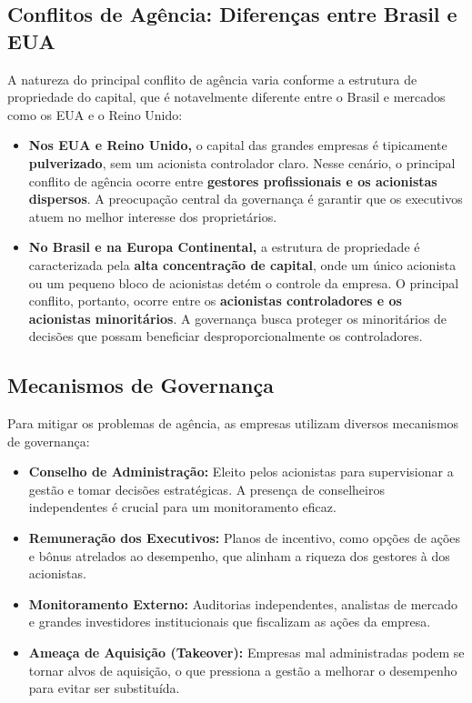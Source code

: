\documentclass[
  a4paper,
]{book}
\providecommand{\tightlist}{%
  \setlength{\itemsep}{0pt}\setlength{\parskip}{0pt}}\usepackage{longtable,booktabs,array}
\begin{document}
\subsection{Conflitos de Agência: Diferenças entre Brasil e
EUA}\label{conflitos-de-aguxeancia-diferenuxe7as-entre-brasil-e-eua}

A natureza do principal conflito de agência varia conforme a estrutura
de propriedade do capital, que é notavelmente diferente entre o Brasil e
mercados como os EUA e o Reino Unido:

\begin{itemize}
\tightlist
\item
  \textbf{Nos EUA e Reino Unido,} o capital das grandes empresas é
  tipicamente \textbf{pulverizado}, sem um acionista controlador claro.
  Nesse cenário, o principal conflito de agência ocorre entre
  \textbf{gestores profissionais e os acionistas dispersos}. A
  preocupação central da governança é garantir que os executivos atuem
  no melhor interesse dos proprietários.
\item
  \textbf{No Brasil e na Europa Continental,} a estrutura de propriedade
  é caracterizada pela \textbf{alta concentração de capital}, onde um
  único acionista ou um pequeno bloco de acionistas detém o controle da
  empresa. O principal conflito, portanto, ocorre entre os
  \textbf{acionistas controladores e os acionistas minoritários}. A
  governança busca proteger os minoritários de decisões que possam
  beneficiar desproporcionalmente os controladores.
\end{itemize}

\subsection{Mecanismos de Governança}\label{mecanismos-de-governanuxe7a}

Para mitigar os problemas de agência, as empresas utilizam diversos
mecanismos de governança:

\begin{itemize}
\tightlist
\item
  \textbf{Conselho de Administração:} Eleito pelos acionistas para
  supervisionar a gestão e tomar decisões estratégicas. A presença de
  conselheiros independentes é crucial para um monitoramento eficaz.
\item
  \textbf{Remuneração dos Executivos:} Planos de incentivo, como opções
  de ações e bônus atrelados ao desempenho, que alinham a riqueza dos
  gestores à dos acionistas.
\item
  \textbf{Monitoramento Externo:} Auditorias independentes, analistas de
  mercado e grandes investidores institucionais que fiscalizam as ações
  da empresa.
\item
  \textbf{Ameaça de Aquisição (Takeover):} Empresas mal administradas
  podem se tornar alvos de aquisição, o que pressiona a gestão a
  melhorar o desempenho para evitar ser substituída.
\end{itemize}
\end{document}
